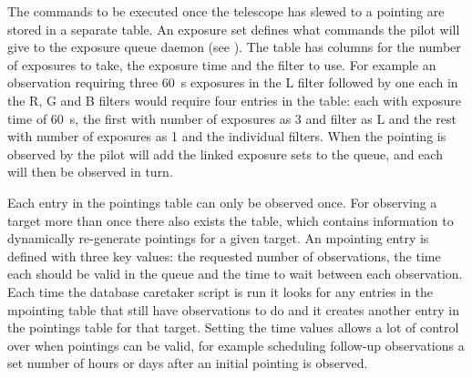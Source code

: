 \begin{colsection}
\begin{colsection}
The commands to be executed once the telescope has slewed to a pointing are stored in a separate  table. An exposure set defines what commands the pilot will give to the exposure queue daemon (see ). The table has columns for the number of exposures to take, the exposure time and the filter to use. For example an observation requiring three \SI{60}{\second} exposures in the L filter followed by one each in the R, G and B filters would require four entries in the table: each with exposure time of \SI{60}{\second}, the first with number of exposures as 3 and filter as L and the rest with number of exposures as 1 and the individual filters. When the pointing is observed by the pilot will add the linked exposure sets to the queue, and each will then be observed in turn.

Each entry in the pointings table can only be observed once. For observing a target more than once there also exists the  table, which contains information to dynamically re-generate pointings for a given target. An mpointing entry is defined with three key values: the requested number of observations, the time each should be valid in the queue and the time to wait between each observation. Each time the database caretaker script is run it looks for any entries in the mpointing table that still have observations to do and it creates another entry in the pointings table for that target. Setting the time values allows a lot of control over when pointings can be valid, for example scheduling follow-up observations a set number of hours or days after an initial pointing is observed.


\end{colsection}
\end{colsection}
